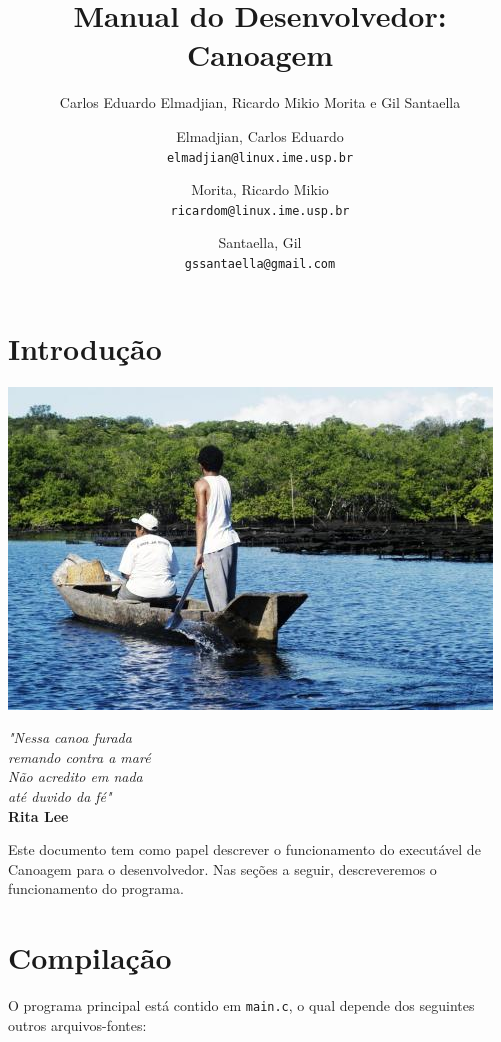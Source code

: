 \documentclass[11pt,a4paper]{article}
\author{Carlos Eduardo Elmadjian, Ricardo Mikio Morita e Gil Santaella}
\author{
  Elmadjian, Carlos Eduardo\\
  \texttt{elmadjian@linux.ime.usp.br}
  \and
  Morita, Ricardo Mikio\\
  \texttt{ricardom@linux.ime.usp.br}
  \and
  Santaella, Gil\\
  \texttt{gssantaella@gmail.com}
}
\title{Manual do Desenvolvedor: Canoagem}
\begin{document}
\maketitle

\section*{Introdução}
\thispagestyle{empty}
\begin{center}
\includegraphics[scale=0.75]{canoa.jpg}
\end{center}
\begin{flushright}
{\footnotesize \textit{"Nessa canoa furada\\ remando contra a maré \\ Não acredito em nada \\ até duvido da fé"}\\ \textbf{Rita Lee}}
\end{flushright}

Este documento tem como papel descrever o funcionamento do executável de Canoagem para o desenvolvedor. Nas seções a seguir, descreveremos o funcionamento do programa.

\section{Compilação}
\setcounter{page}{1}
	O programa principal está contido em \verb|main.c|, o qual depende dos seguintes outros 	arquivos-fontes: \\
\end{document}
